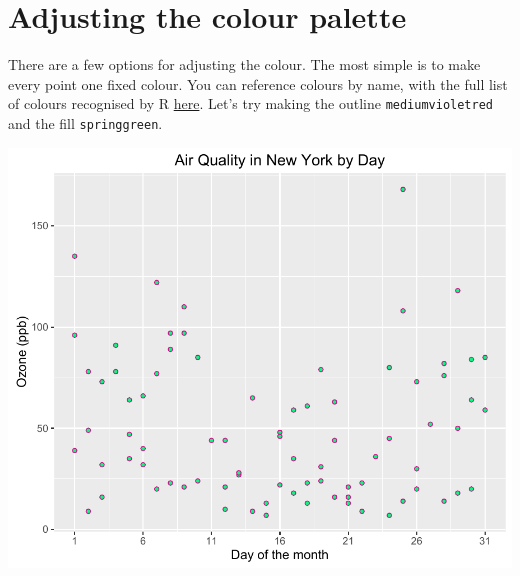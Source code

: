 \section{Adjusting the colour
palette}\label{adjusting-the-colour-palette}

There are a few options for adjusting the colour. The most simple is to
make every point one fixed colour. You can reference colours by name,
with the full list of colours recognised by R
\href{http://www.stat.columbia.edu/~tzheng/files/Rcolor.pdf}{here}.
Let's try making the outline \texttt{mediumvioletred} and the fill
\texttt{springgreen}.

\begin{Shaded}
\begin{Highlighting}[]
\StringTok{ }\NormalTok{(}  \StringTok{ }
\StringTok{  }\NormalTok{(} \NormalTok{, } \NormalTok{, } \NormalTok{) +}
\StringTok{  }\NormalTok{(}\NormalTok{) +}\StringTok{ }
\StringTok{  }\NormalTok{(} \NormalTok{, } \NormalTok{) +}
\StringTok{  }\NormalTok{(} \NormalTok{(}\NormalTok{, }\NormalTok{, }\NormalTok{)) }
\end{Highlighting}
\end{Shaded}

\begin{center}\includegraphics[width=0.6\linewidth]{5_Scatter_Plots_pdf/scatter_5-1} \end{center}

